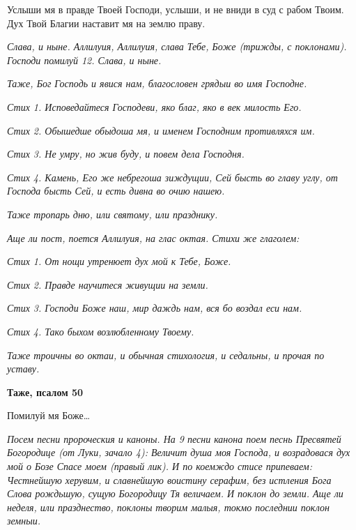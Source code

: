    Услыши мя в правде Твоей Господи, услыши, и не вниди в суд с рабом
Твоим. Дух Твой Благии наставит мя на землю праву.


 \itshape Слава, и ныне\normalfont{}. Аллилуия, Аллилуия, слава Тебе, Боже \itshape (трижды, с
поклонами)\normalfont{}. Господи помилуй \itshape 12\normalfont{}. \itshape Слава, и ныне\normalfont{}.


 \itshape Таже,\normalfont{} Бог Господь и явися нам, благословен грядыи во имя Господне.


 \itshape Стих 1.\normalfont{} Исповедайтеся Господеви, яко благ, яко в век милость
Его.


 \itshape Стих 2.\normalfont{} Обышедше обыдоша мя, и именем Господним противляхся
им.


 \itshape Стих 3.\normalfont{} Не умру, но жив буду, и повем дела Господня.


 \itshape Стих 4.\normalfont{} Камень, Его же небрегоша зиждущии, Сей бысть во главу углу,
от Господа бысть Сей, и есть дивна во очию нашею.


 \itshape Таже тропарь дню, или святому, или празднику.\normalfont{}


 \itshape Аще ли пост, поется Аллилуия, на глас октая. Стихи же глаголем:\normalfont{}


 \itshape Стих 1.\normalfont{} От нощи утренюет дух мой к Тебе, Боже.


 \itshape Стих 2.\normalfont{} Правде научитеся живущии на земли.


 \itshape Стих 3.\normalfont{} Господи Боже наш, мир даждь нам, вся бо воздал еси
нам.


 \itshape Стих 4.\normalfont{} Тако быхом возлюбленному Твоему.


 \itshape Таже троичны во октаи, и обычная стихология, и седальны, и прочая по
уставу.\normalfont{}






 

\bfseries Таже, псалом 50\normalfont{}


   Помилуй мя Боже…


 \itshape Посем песни пророческия и каноны. На 9 песни канона поем песнь
Пресвятей Богородице (от Луки, зачало 4):\normalfont{} Величит душа моя Господа, и
возрадовася дух мой о Бозе Спасе моем \itshape (правый лик). И по коемждо стисе
припеваем:\normalfont{} Честнейшую херувим, и славнейшую воистину серафим, без
истления Бога Слова рождьшую, сущую Богородицу Тя величаем. \itshape И поклон
до земли. Аще ли неделя, или празднество, поклоны творим малыя, токмо
последнии поклон земныи.\normalfont{}



